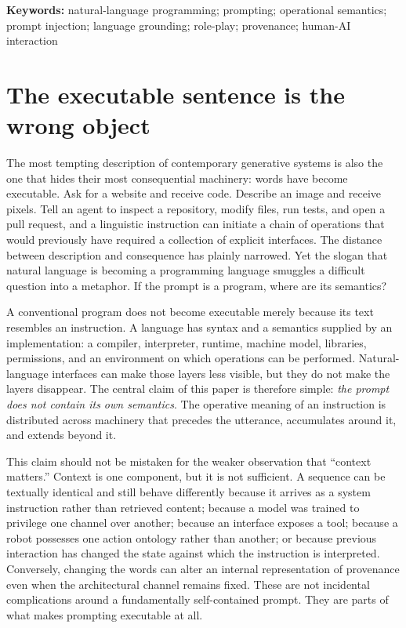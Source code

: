 \documentclass[11pt]{article}
\begin{document}
\textbf{Keywords:} natural-language programming; prompting; operational semantics; prompt injection; language grounding; role-play; provenance; human-AI interaction

\section{The executable sentence is the wrong object}

The most tempting description of contemporary generative systems is also the one that hides their most consequential machinery: words have become executable. Ask for a website and receive code. Describe an image and receive pixels. Tell an agent to inspect a repository, modify files, run tests, and open a pull request, and a linguistic instruction can initiate a chain of operations that would previously have required a collection of explicit interfaces. The distance between description and consequence has plainly narrowed. Yet the slogan that natural language is becoming a programming language smuggles a difficult question into a metaphor. If the prompt is a program, where are its semantics?

A conventional program does not become executable merely because its text resembles an instruction. A language has syntax and a semantics supplied by an implementation: a compiler, interpreter, runtime, machine model, libraries, permissions, and an environment on which operations can be performed. Natural-language interfaces can make those layers less visible, but they do not make the layers disappear. The central claim of this paper is therefore simple: \emph{the prompt does not contain its own semantics}. The operative meaning of an instruction is distributed across machinery that precedes the utterance, accumulates around it, and extends beyond it.

This claim should not be mistaken for the weaker observation that ``context matters.'' Context is one component, but it is not sufficient. A sequence can be textually identical and still behave differently because it arrives as a system instruction rather than retrieved content; because a model was trained to privilege one channel over another; because an interface exposes a tool; because a robot possesses one action ontology rather than another; or because previous interaction has changed the state against which the instruction is interpreted. Conversely, changing the words can alter an internal representation of provenance even when the architectural channel remains fixed. These are not incidental complications around a fundamentally self-contained prompt. They are parts of what makes prompting executable at all.
\end{document}
